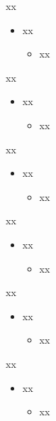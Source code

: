 \documentclass{beamer}
\begin{document}
\begin{frame}[fragile]{xx}
\begin{itemize}
\item xx 
\begin{itemize}
\item xx 
\end{itemize}
\end{itemize}
\end{frame}

\begin{frame}[fragile]{xx}
\begin{itemize}
\item xx 
\begin{itemize}
\item xx 
\end{itemize}
\end{itemize}
\end{frame}

\begin{frame}[fragile]{xx}
\begin{itemize}
\item xx 
\begin{itemize}
\item xx 
\end{itemize}
\end{itemize}
\end{frame}

\begin{frame}[fragile]{xx}
\begin{itemize}
\item xx 
\begin{itemize}
\item xx 
\end{itemize}
\end{itemize}
\end{frame}

\begin{frame}[fragile]{xx}
\begin{itemize}
\item xx 
\begin{itemize}
\item xx 
\end{itemize}
\end{itemize}
\end{frame}

\begin{frame}[fragile]{xx}
\begin{itemize}
\item xx 
\begin{itemize}
\item xx 
\end{itemize}
\end{itemize}
\end{frame}



    
\end{document}
